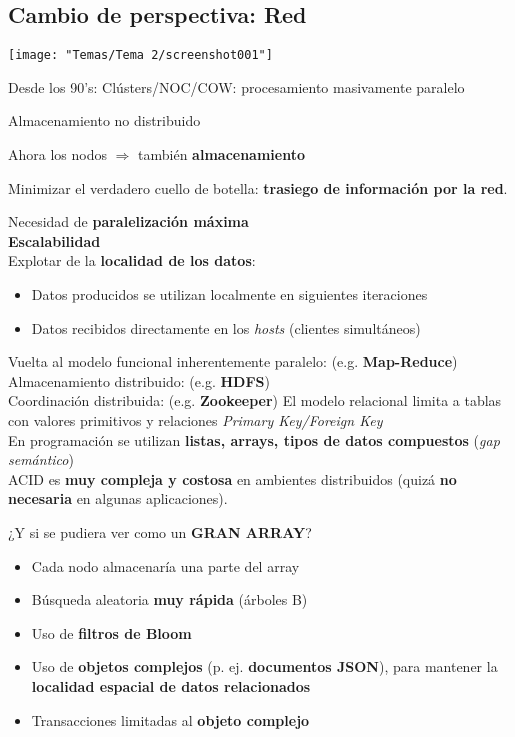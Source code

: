 \subsection{Cambio de perspectiva: Red}
\begin{center}
	\texttt{[image: "Temas/Tema 2/screenshot001"]}
\end{center}
Desde los 90's: Clústers/NOC/COW: procesamiento masivamente paralelo

Almacenamiento no distribuido

Ahora los nodos $\Rightarrow$ también \textbf{almacenamiento}

Minimizar el verdadero cuello de botella: \textbf{trasiego de información por la red}.

Necesidad de \textbf{paralelización máxima}\\
\textbf{Escalabilidad}\\
Explotar de la \textbf{localidad de los datos}:
\begin{itemize}
	\item Datos producidos se utilizan localmente en siguientes iteraciones
\item Datos recibidos directamente en los \textit{hosts} (clientes simultáneos)
\end{itemize}
Vuelta al modelo funcional inherentemente paralelo: (e.g. \textbf{Map-Reduce})\\
Almacenamiento distribuido: (e.g. \textbf{HDFS})\\
Coordinación distribuida: (e.g. \textbf{Zookeeper})
El modelo relacional limita a tablas con valores primitivos y relaciones \textit{Primary Key/Foreign Key}\\
En programación se utilizan \textbf{listas, arrays, tipos de datos compuestos} (\textit{gap semántico})\\
ACID es \textbf{muy compleja y costosa} en ambientes distribuidos (quizá \textbf{no necesaria} en algunas aplicaciones).

¿Y si se pudiera ver como un \textbf{GRAN ARRAY}?
\begin{itemize}
\item Cada nodo almacenaría una parte del array
\item Búsqueda aleatoria \textbf{muy rápida} (árboles B)
\item Uso de \textbf{filtros de Bloom}
\item Uso de \textbf{objetos complejos} (p. ej. \textbf{documentos JSON}), para mantener la \textbf{localidad espacial de datos relacionados} 
\item Transacciones limitadas al \textbf{objeto complejo}
\end{itemize}
